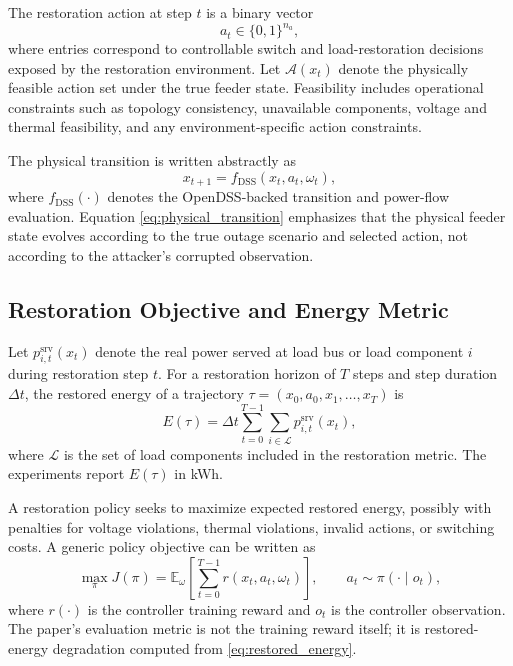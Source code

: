 The restoration action at step $t$ is a binary vector
\begin{equation}
    a_t \in \{0,1\}^{n_a},
\end{equation}
where entries correspond to controllable switch and load-restoration decisions exposed by the restoration environment. Let $\mathcal{A}(x_t)$ denote the physically feasible action set under the true feeder state. Feasibility includes operational constraints such as topology consistency, unavailable components, voltage and thermal feasibility, and any environment-specific action constraints.

The physical transition is written abstractly as
\begin{equation}
    x_{t+1} = f_{\mathrm{DSS}}(x_t,a_t,\omega_t),
    \label{eq:physical_transition}
\end{equation}
where $f_{\mathrm{DSS}}(\cdot)$ denotes the OpenDSS-backed transition and power-flow evaluation. Equation \eqref{eq:physical_transition} emphasizes that the physical feeder state evolves according to the true outage scenario and selected action, not according to the attacker's corrupted observation.

\subsection{Restoration Objective and Energy Metric}
\label{subsec:restoration_objective}

Let $p^{\mathrm{srv}}_{i,t}(x_t)$ denote the real power served at load bus or load component $i$ during restoration step $t$. For a restoration horizon of $T$ steps and step duration $\Delta t$, the restored energy of a trajectory $\tau = (x_0,a_0,x_1,\ldots,x_T)$ is
\begin{equation}
    E(\tau)
    =
    \Delta t
    \sum_{t=0}^{T-1}
    \sum_{i \in \mathcal{L}}
    p^{\mathrm{srv}}_{i,t}(x_t),
    \label{eq:restored_energy}
\end{equation}
where $\mathcal{L}$ is the set of load components included in the restoration metric. The experiments report $E(\tau)$ in kWh.

A restoration policy seeks to maximize expected restored energy, possibly with penalties for voltage violations, thermal violations, invalid actions, or switching costs. A generic policy objective can be written as
\begin{equation}
    \max_{\pi}
    J(\pi)
    =
    \mathbb{E}_{\omega}
    \left[
        \sum_{t=0}^{T-1}
        r(x_t,a_t,\omega_t)
    \right],
    \qquad
    a_t \sim \pi(\cdot \mid o_t),
    \label{eq:policy_objective}
\end{equation}
where $r(\cdot)$ is the controller training reward and $o_t$ is the controller observation. The paper's evaluation metric is not the training reward itself; it is restored-energy degradation computed from \eqref{eq:restored_energy}.

